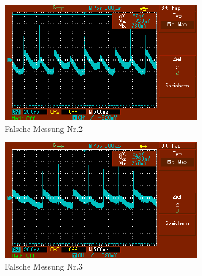 \documentclass[captions=tableheading]{scrartcl}
\begin{document}
    \begin{figure}
        \centering
        \includegraphics{Lock_In Bilder/Aufgabe 4/Komische Bilder/MAP002.pdf}
        \caption{Falsche Messung Nr.2}
        \label{fig:mismess2}
    \end{figure}
    
    \begin{figure}
        \centering
        \includegraphics{Lock_In Bilder/Aufgabe 4/Komische Bilder/MAP003.pdf}
        \caption{Falsche Messung Nr.3}
        \label{fig:mismess3}
    \end{figure}


\end{document}
